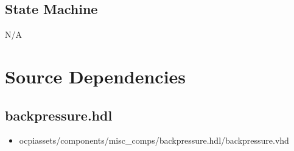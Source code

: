 \documentclass{article}
\def\comp{backpressure}
\begin{document}
\subsection*{State Machine}
	N/A

\section*{Source Dependencies}
\subsection*{\comp.hdl}
\begin{itemize}
	\item ocpiassets/components/misc\_comps/backpressure.hdl/backpressure.vhd
\end{itemize}
\end{document}
